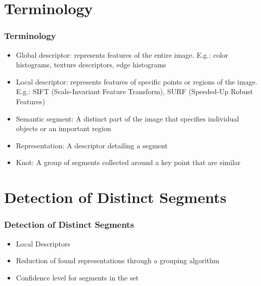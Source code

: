 \documentclass{beamer}
\begin{document}
\section{Terminology}
\begin{frame}
\frametitle{Terminology}

\begin{itemize}
    \item Global descriptor: represents features of the entire image. E.g.: color histograms, texture descriptors, edge histograms
    \item Local descriptor: represents features of specific points or regions of the image. E.g.: SIFT (Scale-Invariant Feature Transform), SURF (Speeded-Up Robust Features)
    \item Semantic segment: A distinct part of the image that specifies individual objects or an important region
    \item Representation: A descriptor detailing a segment
    \item Knot: A group of segments collected around a key point that are similar
\end{itemize}

\end{frame}

\section{Detection of Distinct Segments}
\begin{frame}
\frametitle{Detection of Distinct Segments}

\begin{itemize}
    \item Local Descriptors
    \item Reduction of found representations through a grouping algorithm
    \item Confidence level for segments in the set
\end{itemize}

\end{frame}
\end{document}
